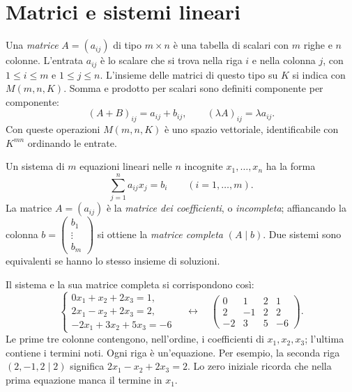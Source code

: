 \section{Matrici e sistemi lineari}
\begin{definizione}
Una \emph{matrice} $A=(a_{ij})$ di tipo $m\times n$ è una tabella di scalari con $m$ righe e $n$ colonne. L’entrata $a_{ij}$ è lo scalare che si trova nella riga $i$ e nella colonna $j$, con $1\leq i\leq m$ e $1\leq j\leq n$. L'insieme delle matrici di questo tipo su $K$ si indica con $M(m,n,K)$. Somma e prodotto per scalari sono definiti componente per componente:
\[
 (A+B)_{ij}=a_{ij}+b_{ij},\qquad (\lambda A)_{ij}=\lambda a_{ij}.
\]
Con queste operazioni $M(m,n,K)$ è uno spazio vettoriale, identificabile con $K^{mn}$ ordinando le entrate.
\end{definizione}
Un sistema di $m$ equazioni lineari nelle $n$ incognite $x_1,\ldots,x_n$ ha la forma
\[
 \sum_{j=1}^n a_{ij}x_j=b_i\qquad(i=1,\ldots,m).
\]
La matrice $A=(a_{ij})$ è la \emph{matrice dei coefficienti}, o \emph{incompleta}; affiancando la colonna $b=\left(\begin{smallmatrix}b_1\\\vdots\\b_m\end{smallmatrix}\right)$ si ottiene la \emph{matrice completa} $(A\mid b)$. Due sistemi sono equivalenti se hanno lo stesso insieme di soluzioni.

\begin{esempio}
Il sistema e la sua matrice completa si corrispondono così:
\[
 \begin{cases}
 0x_1+x_2+2x_3=1,\\
 2x_1-x_2+2x_3=2,\\
 -2x_1+3x_2+5x_3=-6
 \end{cases}
 \quad\longleftrightarrow\quad
 \left(\begin{array}{rrr|r}
 0&1&2&1\\2&-1&2&2\\-2&3&5&-6
 \end{array}\right).
\]
Le prime tre colonne contengono, nell'ordine, i coefficienti di $x_1,x_2,x_3$; l'ultima contiene i termini noti. Ogni riga è un'equazione. Per esempio, la seconda riga $(2,-1,2\mid2)$ significa $2x_1-x_2+2x_3=2$. Lo zero iniziale ricorda che nella prima equazione manca il termine in $x_1$.

\end{esempio}

